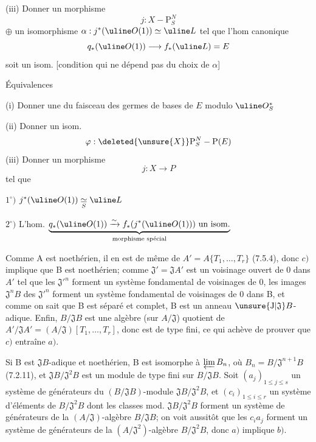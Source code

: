 (iii) Donner un  morphisme
\[
j:X-\mathrm P_S^N
\]
$\oplus$ un isomorphisme $\alpha:j^*(\uline O(1))\simeq\uline L$
tel que l'hom canonique
\[
q_*(\uline O(1))\longrightarrow f_*(\uline L)=E
\]
soit un isom. [condition qui ne dépend pas du choix de $\alpha$]


Équivalences

(i) Donner une  du faisceau des germes de bases de $E$ modulo $\uline O_S^*$

(ii) Donner un isom. 
\[
\varphi:\deleted{\unsure{X}}\mathrm P_S^N-\mathrm P(E)
\]
(iii) Donner un morphisme
\[
j:X\longrightarrow P
\]
tel que

$1^\circ)$ $j^*(\uline O(1))\underset S\simeq\uline L$ 

$2^\circ)$ L'hom. $\underbrace{q_*(\uline O(1))\xrightarrow{\sim}f_*(j^*(\uline O(1)))\ \text{un isom.}}_{\text{morphisme spécial}}$

Comme A est noethérien, il en est de même de $A'=A\{T_1,\ldots,T_r\}$ (7.5.4), donc $c)$ implique que B est noethérien; comme $\mathfrak J'=\mathfrak JA'$ est un voisinage ouvert de 0 dans $A'$ tel que les $\mathfrak J'^n$ forment un système fondamental de voisinages de 0, les images $\mathfrak J^nB$ des $\mathfrak J'^n$ forment un système fondamental de voisinages de 0 dans B, et comme on sait que B est séparé et complet, B est un anneau $\unsure{\mathrm J|\mathfrak J}B$-adique. Enfin, $B/\mathfrak JB$ est une algèbre (sur $A/\mathfrak J$) quotient de $A'/\mathfrak JA'=(A/\mathfrak J)[T_1,\ldots,T_r]$, donc est de type fini, ce qui achève de prouver que $c)$ entraîne $a)$.

Si B est $\mathfrak JB$-adique et noethérien, B est isomorphe à $\varprojlim B_n$, où $B_n=B/\mathfrak J^{n+1}B$ (7.2.11), et $\mathfrak JB/\mathfrak J^2B$ est un module de type fini sur $B/\mathfrak JB$. Soit $(a_j)_{1\leq j\leq s}$ un système de générateurs du $(B/\mathfrak JB)$-module $\mathfrak JB/\mathfrak J^2B$, et $(c_i)_{1\leq i\leq r}$ un système d'éléments de $B/\mathfrak J^2B$ dont les classes mod. $\mathfrak JB/\mathfrak J^2B$ forment un système de générateurs de la $(A/\mathfrak J)$-algèbre $B/\mathfrak JB$; on voit aussitôt que les $c_i a_j$ forment un système de générateurs de la $(A/\mathfrak J^2)$-algèbre $B/\mathfrak J^2B$, donc $a)$ implique $b)$.

